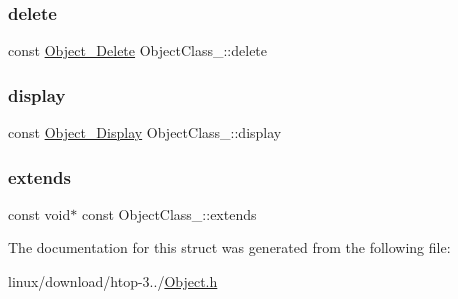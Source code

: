 \subsubsection{\texorpdfstring{delete}{delete}}
{\footnotesize\ttfamily const \hyperlink{Object_8h_ad4d12b504fef15e113a3e939f5afa7fe}{Object\+\_\+\+Delete} Object\+Class\+\_\+\+::delete}

\mbox{\label{structObjectClass___a1705a95c924885d3482bf9ba9e5617f4}} 
\subsubsection{\texorpdfstring{display}{display}}
{\footnotesize\ttfamily const \hyperlink{Object_8h_a7f3c8c316adfe192cfd6068872ea0682}{Object\+\_\+\+Display} Object\+Class\+\_\+\+::display}

\mbox{\label{structObjectClass___ae808ab38820193b96ce3d0ca7f801881}} 
\subsubsection{\texorpdfstring{extends}{extends}}
{\footnotesize\ttfamily const void$\ast$ const Object\+Class\+\_\+\+::extends}



The documentation for this struct was generated from the following file\+:\begin{DoxyCompactItemize}
\item 
linux/download/htop-\/3../\hyperlink{Object_8h}{Object.\+h}\end{DoxyCompactItemize}
